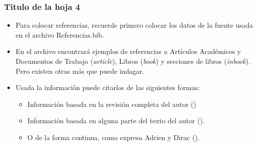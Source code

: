 \documentclass[fleqn]{beamer}
\begin{document}
\begin{frame}
\frametitle{Titulo de la hoja 4}
\begin{itemize}
    \item Para colocar referencias, recuerde primero colocar los datos de la fuente usada en el archivo Referencias.bib.
    \item En el archivo encontrará ejemplos de referencias a Artículos Académicos y Documentos de Trabajo (\textit{article}), Libros (\textit{book}) y secciones de libros (\textit{inbook}). Pero existen otras más que puede indagar.
    \item Usada la información puede citarlos de las siguientes formas:
    \begin{itemize}
        \item Información basada en la revisión completa del autor (\cite{Einstein1905})
        \item Información basada en alguna parte del texto del autor (\cite[p.~150]{Knuth1973}).
        \item  O de la forma continua, como expresa Adrien y Dirac (\citeyear{Adrien&Dirac1981}).
    \end{itemize}
\end{itemize}
\end{frame}

\begin{frame}
  \titlepage
\end{frame}
\end{document}
